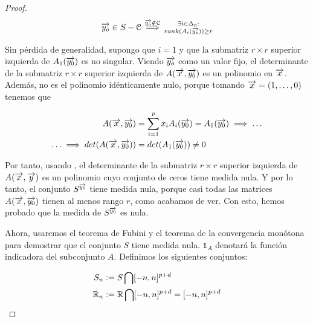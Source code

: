 \begin{proof}
    \begin{equation}
        \begin{split}
            \overrightarrow{y_o} \in S - \mathcal{C} \stackrel{\overrightarrow{y_o} \notin \mathcal{C}}{\implies} \substack{\exists i \in \Delta_{p}: \\ rank(A_i(\overrightarrow{y_o})) \geq r}
        \end{split}
    \end{equation}

    Sin pérdida de generalidad, supongo que $i = 1$ y que la submatriz $r \times r$ superior izquierda de $A_1(\overrightarrow{y_0})$ es no singular. Viendo $\overrightarrow{y_o}$ como un valor fijo, el determinante de la submatriz $r \times r$ superior izquierda de $A(\overrightarrow{x}, \overrightarrow{y_0})$ es un polinomio en $\overrightarrow{x}$. Además, no es el polinomio idénticamente nulo, porque tomando $\overrightarrow{x} = (1, \ldots, 0)$ tenemos que

    \begin{equation}
    \begin{split}
        A(\overrightarrow{x}, \overrightarrow{y_0}) &= \sum_{i = 1}^{p} x_i A_i(\overrightarrow{y_0}) = A_1(\overrightarrow{y_0}) \implies \ldots \\
        \ldots \implies det(A(\overrightarrow{x}, \overrightarrow{y_0})) &= det(A_1(\overrightarrow{y_0})) \neq 0
    \end{split}
    \end{equation}

    Por tanto, usando , el determinante de la submatriz $r \times r$ superior izquierda de $A(\overrightarrow{x}, \overrightarrow{y})$ es un polinomio cuyo conjunto de ceros tiene medida nula. Y por lo tanto, el conjunto $S^{\overrightarrow{y_0}}$ tiene medida nula, porque casi todas las matrices $A(\overrightarrow{x}, \overrightarrow{y_0})$ tienen al menos rango $r$, como acabamos de ver. Con esto, hemos probado que la medida de $S^{\overrightarrow{y_0}}$ es nula.

    Ahora, usaremos el teorema de Fubini y el teorema de la convergencia monótona para demostrar que el conjunto $S$ tiene medida nula. $\mathbb{1}_A$ denotará la función indicadora del subconjunto $A$. Definimos los siguientes conjuntos:

    \begin{equation}
        \begin{split}
            S_n &:= S \bigcap [-n, n]^{p+d} \\
            \mathbb{R}_n &:= \mathbb{R} \bigcap [-n, n]^{p+d} = [-n, n]^{p+d}
        \end{split}
    \end{equation}


\end{proof}
